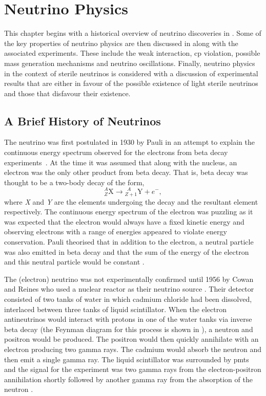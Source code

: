 \chapter{Neutrino Physics}
\label{chap:Neutrino Physics}

This chapter begins with a historical overview of neutrino discoveries in . Some of the key properties of neutrino physics are then discussed in  along with the associated experiments. These include the weak interaction, \gls{cp} violation, possible mass generation mechanisms and neutrino oscillations. Finally, neutrino physics in the context of sterile neutrinos is considered with a discussion of experimental results that are either in favour of the possible existence of light sterile neutrinos and those that disfavour their existence. 

\section{A Brief History of Neutrinos}\label{sec:history_of_neutrino_flavours}

The neutrino was first postulated in 1930 by Pauli in an attempt to explain the continuous energy spectrum observed for the electrons from beta decay experiments~\cite{Pauli_letter}. At the time it was assumed that along with the nucleus, an electron was the only other product from beta decay. That is, beta decay was thought to be a two-body decay of the form,
\begin{equation}
    {^A_Z}\text{X} \longrightarrow {^{\ \ A}_{Z+1}}\text{Y} + e^-,
\end{equation}
where \textit{X} and \textit{Y} are the elements undergoing the decay and the resultant element respectively. The continuous energy spectrum of the electron was puzzling as it was expected that the electron would always have a fixed kinetic energy and observing electrons with a range of energies appeared to violate energy conservation. Pauli theorised that in addition to the electron, a neutral particle was also emitted in beta decay and that the sum of the energy of the electron and this neutral particle would be constant \cite{Pauli_letter}.

The (electron) neutrino was not experimentally confirmed until 1956 by Cowan and Reines who used a nuclear reactor as their neutrino source \cite{cowan_and_reines_paper}. Their detector consisted of two tanks of water in which cadmium chloride had been dissolved, interlaced between three tanks of liquid scintillator. When the electron antineutrinos would interact with protons in one of the water tanks via inverse beta decay (the Feynman diagram for this process is shown in ), a neutron and positron would be produced. The positron would then quickly annihilate with an electron producing two gamma rays. The cadmium would absorb the neutron and then emit a single gamma ray. The liquid scintillator was surrounded by \Glspl{pmt} and the signal for the experiment was two gamma rays from the electron-positron annihilation shortly followed by another gamma ray from the absorption of the neutron \cite{cowan_and_reines_paper}.

